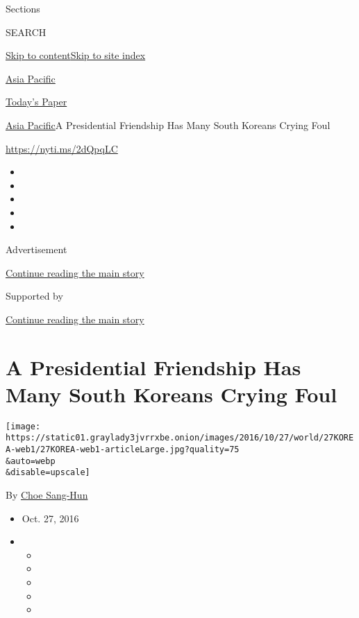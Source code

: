 Sections

SEARCH

\protect\hyperlink{site-content}{Skip to
content}\protect\hyperlink{site-index}{Skip to site index}

\href{https://www.nytimes3xbfgragh.onion/section/world/asia}{Asia
Pacific}

\href{https://myaccount.nytimes3xbfgragh.onion/auth/login?response_type=cookie\&client_id=vi}{}

\href{https://www.nytimes3xbfgragh.onion/section/todayspaper}{Today's
Paper}

\href{/section/world/asia}{Asia Pacific}\textbar{}A Presidential
Friendship Has Many South Koreans Crying Foul

\url{https://nyti.ms/2dQpqLC}

\begin{itemize}
\item
\item
\item
\item
\item
\end{itemize}

Advertisement

\protect\hyperlink{after-top}{Continue reading the main story}

Supported by

\protect\hyperlink{after-sponsor}{Continue reading the main story}

\hypertarget{a-presidential-friendship-has-many-south-koreans-crying-foul}{%
\section{A Presidential Friendship Has Many South Koreans Crying
Foul}\label{a-presidential-friendship-has-many-south-koreans-crying-foul}}

\texttt{[image: https://static01.graylady3jvrrxbe.onion/images/2016/10/27/world/27KOREA-web1/27KOREA-web1-articleLarge.jpg?quality=75\\\&auto=webp\\\&disable=upscale]}

By \href{http://www.nytimes3xbfgragh.onion/by/choe-sang-hun}{Choe
Sang-Hun}

\begin{itemize}
\item
  Oct. 27, 2016
\item
  \begin{itemize}
  \item
  \item
  \item
  \item
  \item
  \end{itemize}
\end{itemize}

